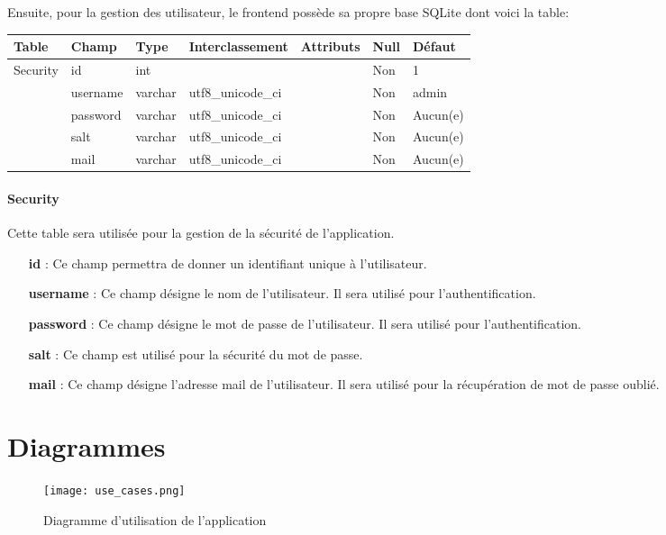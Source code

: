 Ensuite, pour la gestion des utilisateur, le frontend possède sa propre base SQLite dont voici la table:

\vspace{2em}

\begin{tabular}{|l|l|l|l|l|l|l|}
   \hline
    Table & Champ & Type & Interclassement & Attributs & Null & Défaut \\
    \hline
        Security & id & int &  &  & Non & 1 \\
    \cline{2-7}
         & username & varchar & utf8\_unicode\_ci & & Non & admin \\
    \cline{2-7}
         & password & varchar & utf8\_unicode\_ci & & Non & Aucun(e) \\
    \cline{2-7}
         & salt & varchar & utf8\_unicode\_ci & & Non & Aucun(e) \\
    \cline{2-7}
         & mail & varchar & utf8\_unicode\_ci & & Non & Aucun(e) \\
    \hline
\end{tabular}

\paragraph{Security} Cette table sera utilisée pour la gestion de la sécurité de l'application.
\begin{itemize}
    \item [\textbf{id}] : Ce champ permettra de donner un identifiant unique à l'utilisateur.
    \item [\textbf{username}] : Ce champ désigne le nom de l'utilisateur. Il sera utilisé pour l'authentification.
    \item [\textbf{password}] : Ce champ désigne le mot de passe de l'utilisateur. Il sera utilisé pour l'authentification.
    \item [\textbf{salt}] : Ce champ est utilisé pour la sécurité du mot de passe.
    \item [\textbf{mail}] : Ce champ désigne l'adresse mail de l'utilisateur. Il sera utilisé pour la récupération de mot de passe oublié.
\end{itemize}

\section{Diagrammes}

\begin{figure}[H]
    \texttt{[image: use\_cases.png]}
    \caption{Diagramme d'utilisation de l'application}
    \label{fig:use_cases}
\end{figure}

